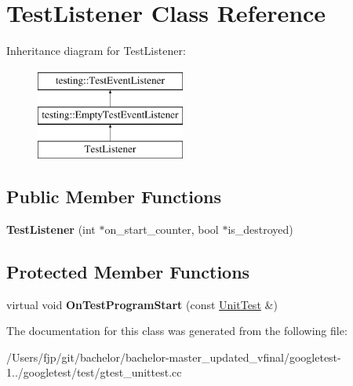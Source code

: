 \hypertarget{class_test_listener}{}\section{Test\+Listener Class Reference}
\label{class_test_listener}
Inheritance diagram for Test\+Listener\+:\begin{figure}[H]
\begin{center}
\leavevmode
\includegraphics[height=3.000000cm]{class_test_listener}
\end{center}
\end{figure}
\subsection*{Public Member Functions}
\begin{DoxyCompactItemize}
\item 
\mbox{\label{class_test_listener_ab65604c6c3742c494e9378e770da5d42}} 
{\bfseries Test\+Listener} (int $\ast$on\+\_\+start\+\_\+counter, bool $\ast$is\+\_\+destroyed)
\end{DoxyCompactItemize}
\subsection*{Protected Member Functions}
\begin{DoxyCompactItemize}
\item 
\mbox{\label{class_test_listener_a6218f522f5b6b37050ff0ea630ac5fd3}} 
virtual void {\bfseries On\+Test\+Program\+Start} (const \mbox{\hyperlink{classtesting_1_1_unit_test}{Unit\+Test}} \&)
\end{DoxyCompactItemize}


The documentation for this class was generated from the following file\+:\begin{DoxyCompactItemize}
\item 
/\+Users/fjp/git/bachelor/bachelor-\/master\+\_\+updated\+\_\+vfinal/googletest-\/1../googletest/test/gtest\+\_\+unittest.\+cc\end{DoxyCompactItemize}
